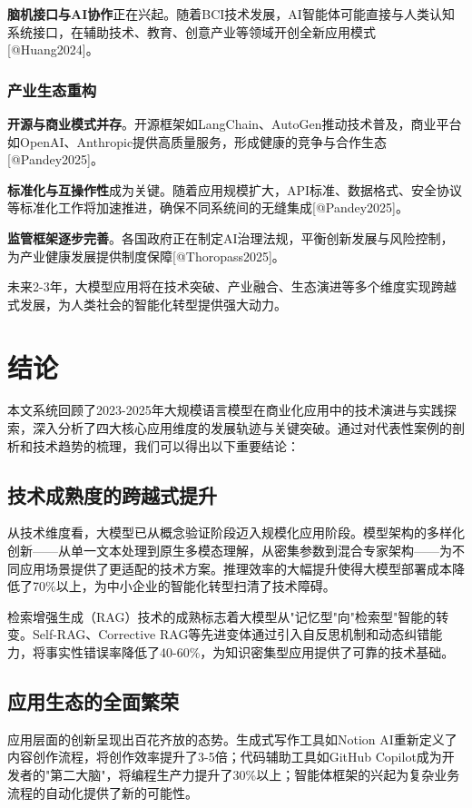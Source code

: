 \documentclass{article}
\begin{document}
\textbf{脑机接口与AI协作}正在兴起。随着BCI技术发展，AI智能体可能直接与人类认知系统接口，在辅助技术、教育、创意产业等领域开创全新应用模式[@Huang2024]。

\subsubsection{产业生态重构}
\textbf{开源与商业模式并存}。开源框架如LangChain、AutoGen推动技术普及，商业平台如OpenAI、Anthropic提供高质量服务，形成健康的竞争与合作生态[@Pandey2025]。

\textbf{标准化与互操作性}成为关键。随着应用规模扩大，API标准、数据格式、安全协议等标准化工作将加速推进，确保不同系统间的无缝集成[@Pandey2025]。

\textbf{监管框架逐步完善}。各国政府正在制定AI治理法规，平衡创新发展与风险控制，为产业健康发展提供制度保障[@Thoropass2025]。

未来2-3年，大模型应用将在技术突破、产业融合、生态演进等多个维度实现跨越式发展，为人类社会的智能化转型提供强大动力。

\section{结论}
本文系统回顾了2023-2025年大规模语言模型在商业化应用中的技术演进与实践探索，深入分析了四大核心应用维度的发展轨迹与关键突破。通过对代表性案例的剖析和技术趋势的梳理，我们可以得出以下重要结论：

\subsection{技术成熟度的跨越式提升}
从技术维度看，大模型已从概念验证阶段迈入规模化应用阶段。模型架构的多样化创新——从单一文本处理到原生多模态理解，从密集参数到混合专家架构——为不同应用场景提供了更适配的技术方案。推理效率的大幅提升使得大模型部署成本降低了70\%以上，为中小企业的智能化转型扫清了技术障碍。

检索增强生成（RAG）技术的成熟标志着大模型从"记忆型"向"检索型"智能的转变。Self-RAG、Corrective RAG等先进变体通过引入自反思机制和动态纠错能力，将事实性错误率降低了40-60\%，为知识密集型应用提供了可靠的技术基础。

\subsection{应用生态的全面繁荣}
应用层面的创新呈现出百花齐放的态势。生成式写作工具如Notion AI重新定义了内容创作流程，将创作效率提升了3-5倍；代码辅助工具如GitHub Copilot成为开发者的"第二大脑"，将编程生产力提升了30\%以上；智能体框架的兴起为复杂业务流程的自动化提供了新的可能性。
\end{document}
